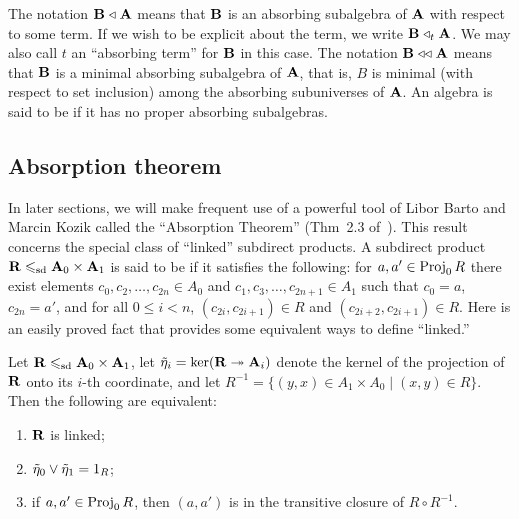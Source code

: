 The notation $\mathbf{B} \mathrel{\triangleleft} \mathbf{A}$ means that
$\mathbf{B}$ is an absorbing subalgebra of $\mathbf{A}$ with respect to some term.
If we wish to be explicit about the term, we write $\mathbf{B} \mathrel{\triangleleft}_t \mathbf{A}$.
We may also call $t$ an ``absorbing term'' for $\mathbf{B}$ in this case.
The notation $\mathbf{B} \mathrel{\triangleleft\triangleleft} \mathbf{A}$ 
means that $\mathbf{B}$ is a minimal absorbing subalgebra of $\mathbf{A}$, that is, 
$B$ is minimal (with respect to set inclusion) among the absorbing subuniverses
of $\mathbf{A}$. 
An algebra is said to be  if it has no proper absorbing
subalgebras.

\subsection{Absorption theorem}
\label{sec:absorption-thm}
In later sections, we will make frequent use of a 
powerful tool of Libor Barto and Marcin Kozik called the 
``Absorption Theorem'' (Thm~2.3 of~\cite{MR2893395}).
This result concerns the special class of ``linked'' subdirect products.  
A subdirect product $\mathbf{R} \leqslant_{\mathrm{sd}} \mathbf{A}_0 \times \mathbf{A}_1$
is said to be  if it satisfies the following:
for $a, a' \in \operatorname{Proj}_0 R$ there 
exist elements $c_0, c_2, \dots, c_{2n} \in A_0$ and
$c_1, c_3, \dots, c_{2n+1} \in A_1$ such that $c_0 = a$, 
$c_{2n} = a'$, and for all $0\leq i<n$, 
$(c_{2i},c_{2i+1})\in R$ and $(c_{2i+2},c_{2i+1})\in R$.
Here is an easily proved fact that provides some equivalent ways to define ``linked.''
\begin{Fact}
Let $\mathbf{R} \leqslant_{\mathrm{sd}} \mathbf{A}_0 \times \mathbf{A}_1$, let $\tilde{\eta}_i = \ker(\mathbf{R} \twoheadrightarrow \mathbf{A}_i)$
denote the kernel of the projection of $\mathbf{R}$ onto its $i$-th coordinate, and let 
$R^{-1} = \{(y,x) \in A_1 \times A_0 \mid (x,y) \in R\}$. 
Then the following are equivalent:
\begin{enumerate}
\item $\mathbf{R}$ is linked;
\item $\tilde{\eta}_0\vee \tilde{\eta}_1 = 1_R$;
\item if $a, a' \in \operatorname{Proj}_0 R$, then $(a,a')$ is in the transitive closure of $R\circ R^{-1}$.
\end{enumerate}
\end{Fact}

